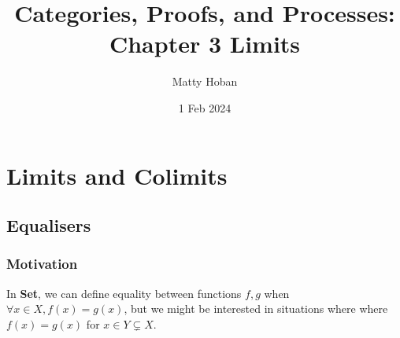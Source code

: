 \documentclass[11pt]{article} %
\title{Categories, Proofs, and Processes: \\Chapter 3 Limits}
\author{Matty Hoban}
\date{1 Feb 2024}
\theoremstyle{definition}
\theoremstyle{definition}
\theoremstyle{definition}
\begin{document}
%
\maketitle






\addtocounter{section}{2}
\section{Limits and Colimits}
\subsection{Equalisers}
\subsubsection{Motivation}
In \textbf{Set}, we can define equality between functions $f,g$ when $\forall x\in X, f(x)=g(x)$,
but we might be interested in situations where where $f(x)=g(x)$ for $x\in Y\subsetneq X$.
\end{document}
